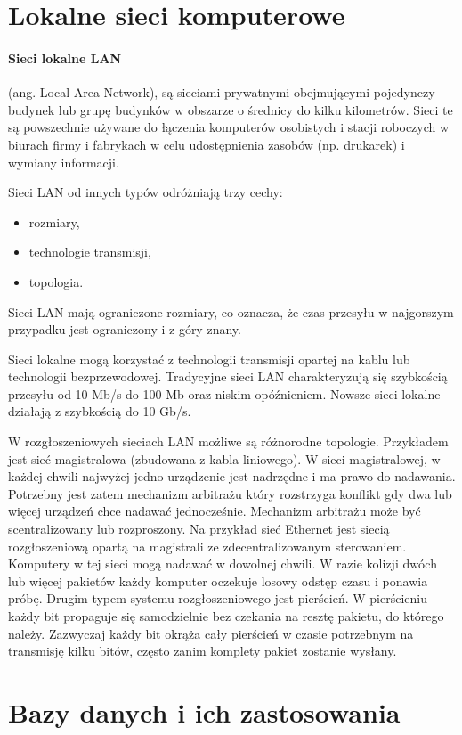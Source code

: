 \documentclass[a4paper,twoside]{report}
\begin{document}
\section{Lokalne sieci komputerowe}
\paragraph{Sieci lokalne LAN} (ang. Local Area Network), są sieciami prywatnymi obejmującymi pojedynczy budynek lub grupę budynków w obszarze o średnicy do kilku kilometrów. Sieci te są powszechnie używane do łączenia komputerów osobistych i stacji roboczych w biurach firmy i fabrykach w celu udostępnienia zasobów (np. drukarek) i wymiany informacji. 

Sieci LAN od innych typów odróżniają trzy cechy:
\begin{itemize}
\item rozmiary,
\item technologie transmisji,
\item topologia.
\end{itemize}

Sieci LAN mają ograniczone rozmiary, co oznacza, że czas przesyłu w najgorszym przypadku jest ograniczony i z góry znany.

Sieci lokalne mogą korzystać z technologii transmisji opartej na kablu lub technologii bezprzewodowej. Tradycyjne sieci LAN charakteryzują się szybkością przesyłu od 10 Mb/s do 100 Mb oraz niskim opóźnieniem. Nowsze sieci lokalne działają z szybkością do 10 Gb/s. 

W rozgłoszeniowych sieciach LAN możliwe są różnorodne topologie. Przykładem jest sieć magistralowa (zbudowana z kabla liniowego). W sieci magistralowej, w każdej chwili najwyżej jedno urządzenie jest nadrzędne i ma prawo do nadawania. Potrzebny jest zatem mechanizm arbitrażu który rozstrzyga konflikt gdy dwa lub więcej urządzeń chce nadawać jednocześnie. Mechanizm arbitrażu może być scentralizowany lub rozproszony. Na przykład sieć Ethernet jest siecią rozgłoszeniową opartą na magistrali ze zdecentralizowanym sterowaniem. Komputery w tej sieci mogą nadawać w dowolnej chwili. W razie kolizji dwóch lub więcej pakietów każdy komputer oczekuje losowy odstęp czasu i ponawia próbę. Drugim typem systemu rozgłoszeniowego jest pierścień. W pierścieniu każdy bit propaguje się samodzielnie bez czekania na resztę pakietu, do którego należy. Zazwyczaj każdy bit okrąża cały pierścień w czasie potrzebnym na transmisję kilku bitów, często zanim komplety pakiet zostanie wysłany.
\section{Bazy danych i ich zastosowania}
\end{document}
